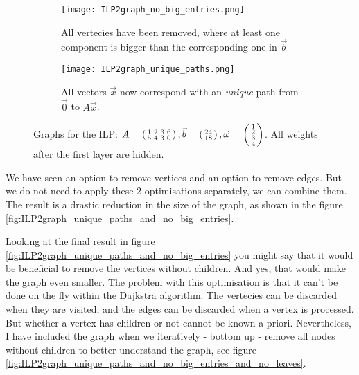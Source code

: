 \begin{figure}
    \centering
    \begin{subfigure}[b]{0.45\textwidth}
        \texttt{[image: ILP2graph\_no\_big\_entries.png]}
        \caption{All vertecies have been removed, where at least one component is bigger than the corresponding one in $\vec b$}
        \label{fig:ILP2graph_no_big_entries}
    \end{subfigure}
    \hfill
    \begin{subfigure}[b]{0.45\textwidth}
        \texttt{[image: ILP2graph\_unique\_paths.png]}
        \caption{All vectors $\vec x$ now correspond with an \textit{unique} path from $\vec 0$ to $A\vec x$.}
        \label{fig:ILP2graph_unique_paths}
    \end{subfigure}
    \caption{Graphs for the ILP: $A = \left(\begin{smallmatrix}1&2&3&6\\5&4&3&0\end{smallmatrix}\right), \vec b = \left(\begin{smallmatrix}24\\18\end{smallmatrix}\right), \vec \omega = \left(\begin{smallmatrix}1\\2\\3\\4\end{smallmatrix}\right)$. All weights after the first layer are hidden.}
\end{figure}

We have seen an option to remove vertices and an option to remove edges. But we do not need to apply these 2 optimisations separately, we can combine them. The result is a drastic reduction in the size of the graph, as shown in the figure \ref{fig:ILP2graph_unique_paths_and_no_big_entries}.

Looking at the final result in figure \ref{fig:ILP2graph_unique_paths_and_no_big_entries} you might say that it would be beneficial to remove the vertices without children. And yes, that would make the graph even smaller. The problem with this optimisation is that it can't be done on the fly within the Dajkstra algorithm. The vertecies can be discarded when they are visited, and the edges can be discarded when a vertex is processed. But whether a vertex has children or not cannot be known a priori. Nevertheless, I have included the graph when we iteratively - bottom up - remove all nodes without children to better understand the graph, see figure \ref{fig:ILP2graph_unique_paths_and_no_big_entries_and_no_leaves}.

